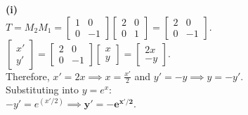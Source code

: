 \begin{solution}
\textbf{(i)} \\
$T = M_2 M_1 = \begin{bmatrix} 1 & 0 \\ 0 & -1 \end{bmatrix} \begin{bmatrix} 2 & 0 \\ 0 & 1 \end{bmatrix} = \begin{bmatrix} 2 & 0 \\ 0 & -1 \end{bmatrix}$. \\
$\begin{bmatrix} x' \\ y' \end{bmatrix} = \begin{bmatrix} 2 & 0 \\ 0 & -1 \end{bmatrix} \begin{bmatrix} x \\ y \end{bmatrix} = \begin{bmatrix} 2x \\ -y \end{bmatrix}$. \\
Therefore, $x' = 2x \implies x = \frac{x'}{2}$ and $y' = -y \implies y = -y'$. \\
Substituting into $y = e^x$: \\
$-y' = e^{(x'/2)} \implies \mathbf{y' = -e^{x'/2}}$. 


\end{solution}
